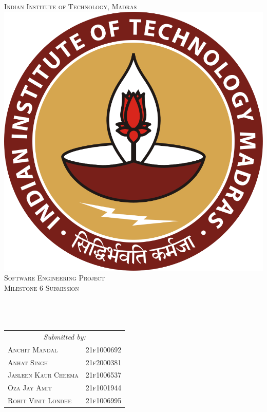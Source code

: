 
\begin{titlepage}   
   \begin{center}        
        \textsc{\LARGE Indian Institute of Technology, Madras}\\[1.5cm]
        \includegraphics[scale=.2]{img/iitm_logo.png}\\[1cm]
        \textsc{\Large Software Engineering Project}\\[0.5cm]
        \textsc{\large Milestone 6 Submission}\\[0.5cm]

        \vspace{3em}
        \HRule \\[0.4cm]
        { \huge \doctitle}\\[0.4cm]
        \HRule \\[1.5cm]

        \begin{table}[!h]
            \centering
            \begin{tabular}{ll}
            \multicolumn{2}{c}{\Large \emph{Submitted by:}} \\[2ex]
            \textsc{Anchit Mandal} & \textsc{21f1000692} \\
            \textsc{Anhat Singh} & \textsc{21f2000381} \\
            \textsc{Jasleen Kaur Cheema} & \textsc{21f1006537} \\
            \textsc{Oza Jay Amit} & \textsc{21f1001944} \\
            \textsc{Rohit Vinit Londhe} & \textsc{21f1006995}
            \end{tabular}            
        \end{table}
        \vspace{3cm}
        

\end{center}
\end{titlepage}
